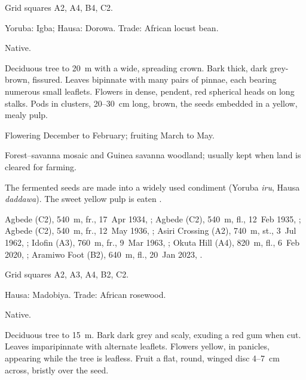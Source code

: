  Grid squares A2, A4, B4, C2.

\begin{center}
\end{center}

\label{sp:FAB02}

 Yoruba: Igba; Hausa: Dorowa. Trade:
African locust bean.

 Native.

 Deciduous tree to 20~m with a wide, spreading
crown. Bark thick, dark grey-brown, fissured. Leaves bipinnate with
many pairs of pinnae, each bearing numerous small leaflets. Flowers in
dense, pendent, red spherical heads on long stalks. Pods in clusters,
20--30~cm long, brown, the seeds embedded in a yellow, mealy pulp.

 Flowering December to February; fruiting March to
May.

 Forest--savanna mosaic and Guinea savanna woodland;
usually kept when land is cleared for farming.

 The fermented seeds are made into a widely used condiment
(Yoruba \textit{iru}, Hausa \textit{daddawa}). The sweet yellow pulp
is eaten \citep{arbonnier2004,orwa2009}.

 Agbede (C2), 540~m, fr., 17~Apr 1934, ;
Agbede (C2), 540~m, fl., 12~Feb 1935, ;
Agbede (C2), 540~m, fr., 12~May 1936, ;
Asiri Crossing (A2), 740~m, st., 3~Jul 1962, ;
Idofin (A3), 760~m, fr., 9~Mar 1963, ;
Okuta Hill (A4), 820~m, fl., 6~Feb 2020, ;
Aramiwo Foot (B2), 640~m, fl., 20~Jan 2023, .

 Grid squares A2, A3, A4, B2, C2.

\begin{center}
\end{center}

\label{sp:FAB03}

 Hausa: Madobiya. Trade: African
rosewood.

 Native.

 Deciduous tree to 15~m. Bark dark grey and scaly,
exuding a red gum when cut. Leaves imparipinnate with alternate
leaflets. Flowers yellow, in panicles, appearing while the tree is
leafless. Fruit a flat, round, winged disc 4--7~cm across, bristly
over the seed.


